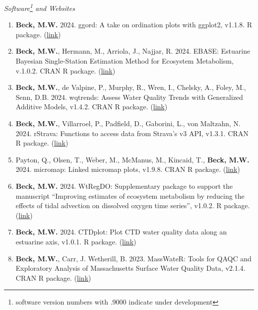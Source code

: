 \documentclass[letterpaper,12pt]{article}
\begin{document}
\vspace{\baselineskip} 
\centerline{\large{\textit{Software\footnote{software version numbers with .9000 indicate under development} and Websites}}}

\begin{enumerate}

\item \textbf{Beck, M.W.} 2024. ggord: A take on ordination plots with ggplot2, v1.1.8. R package. ({\footnotesize\href{https://fawda123.github.io/ggord/}{link}})

\item \textbf{Beck, M.W.}, Hermann, M., Arriola, J., Najjar, R. 2024. EBASE: Estuarine Bayesian Single-Station Estimation Method for Ecosystem Metabolism, v.1.0.2. CRAN R package. ({\footnotesize\href{https://fawda123.github.io/EBASE/}{link}})

\item \textbf{Beck, M.W.}, de Valpine, P., Murphy, R., Wren, I., Chelsky, A., Foley, M., Senn, D.B. 2024. wqtrends: Assess Water Quality Trends with Generalized Additive Models, v1.4.2. CRAN R package. ({\footnotesize\href{https://tbep-tech.github.io/wqtrends/}{link}})

\item \textbf{Beck, M.W.}, Villarroel, P., Padfield, D., Gaborini, L., von Maltzahn, N. 2024. rStrava: Functions to access data from Strava's v3 API, v1.3.1. CRAN R package. ({\footnotesize\href{https://cran.r-project.org/web/packages/rStrava/index.html}{link}})

\item Payton, Q., Olsen, T., Weber, M., McManus, M., Kincaid, T., \textbf{Beck, M.W.} 2024. micromap: Linked micromap plots, v1.9.8. CRAN R package. ({\footnotesize\href{https://cran.r-project.org/web/packages/micromap/index.html}{link}})

\item \textbf{Beck, M.W.} 2024. WtRegDO: Supplementary package to support the manuscript ``Improving estimates of ecosystem metabolism by reducing the effects of tidal advection on dissolved oxygen time series'', v1.0.2. R package. ({\footnotesize\href{http://github.com/fawda123/WtRegDO}{link}})

\item \textbf{Beck, M.W.} 2024. CTDplot: Plot CTD water quality data along an estuarine axis, v1.0.1. R package. ({\footnotesize\href{https://github.com/fawda123/CTDplot}{link}})

\item \textbf{Beck, M.W.}, Carr, J. Wetherill, B. 2023. MassWateR: Tools for QAQC and Exploratory Analysis of Massachusetts Surface Water Quality Data, v2.1.4. CRAN R package. ({\footnotesize\href{https://massbays-tech.github.io/MassWateR/}{link}})


\end{enumerate}
\end{document}
